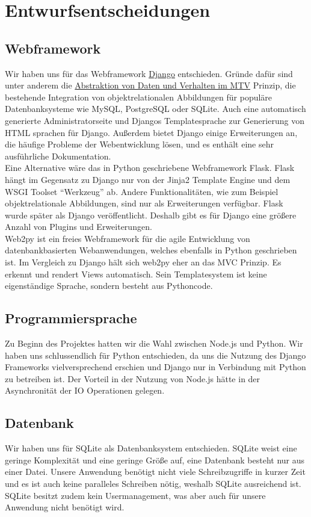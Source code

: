 \section{Entwurfsentscheidungen}
\subsection{Webframework}
Wir haben uns für das Webframework \href{https://www.djangoproject.com/}{Django} entschieden. Gründe dafür sind unter anderem die \href{https://docs.djangoproject.com/en/3.0/faq/general/#faq-mtv}{Abstraktion von Daten und Verhalten im MTV} Prinzip, die bestehende Integration von objektrelationalen Abbildungen für populäre Datenbanksysteme wie MySQL, PostgreSQL oder SQLite. Auch eine automatisch generierte Administratorseite und Djangos Templatesprache zur Generierung von HTML sprachen für Django. Außerdem bietet Django einige Erweiterungen an, die häufige Probleme der Webentwicklung lösen, und es enthält eine sehr ausführliche Dokumentation. \\

\noindent Eine Alternative wäre das in Python geschriebene Webframework Flask. Flask hängt im Gegensatz zu Django nur von der Jinja2 Template Engine und dem WSGI Toolset "`Werkzeug"' ab. Andere Funktionalitäten, wie zum Beispiel objektrelationale Abbildungen, sind nur als Erweiterungen verfügbar.
Flask wurde später als Django veröffentlicht. Deshalb gibt es für Django eine größere Anzahl von Plugins und Erweiterungen. \\

\noindent 
Web2py ist ein freies Webframework für die agile Entwicklung von datenbankbasierten Webanwendungen, welches ebenfalls in Python geschrieben ist. Im Vergleich zu Django hält sich web2py eher an das MVC Prinzip. Es erkennt und rendert Views automatisch. Sein Templatesystem ist keine eigenständige Sprache, sondern besteht aus Pythoncode.
\newpage
\subsection{Programmiersprache}
Zu Beginn des Projektes hatten wir die Wahl zwischen Node.js und Python. Wir haben uns schlussendlich für Python entschieden, da uns die Nutzung des Django Frameworks vielversprechend erschien und Django nur in Verbindung mit Python zu betreiben ist. Der Vorteil in der Nutzung von Node.js hätte in der Asynchronität der IO Operationen gelegen.
\vspace{1,5cm}
\subsection{Datenbank}
Wir haben uns für SQLite als Datenbanksystem entschieden. SQLite weist eine geringe Komplexität und eine geringe Größe auf, eine Datenbank besteht nur aus einer Datei. Unsere Anwendung benötigt nicht viele Schreibzugriffe in kurzer Zeit und es ist auch keine paralleles Schreiben nötig, weshalb SQLite ausreichend ist. SQLite besitzt zudem kein Usermanagement, was aber auch für unsere Anwendung nicht benötigt wird.